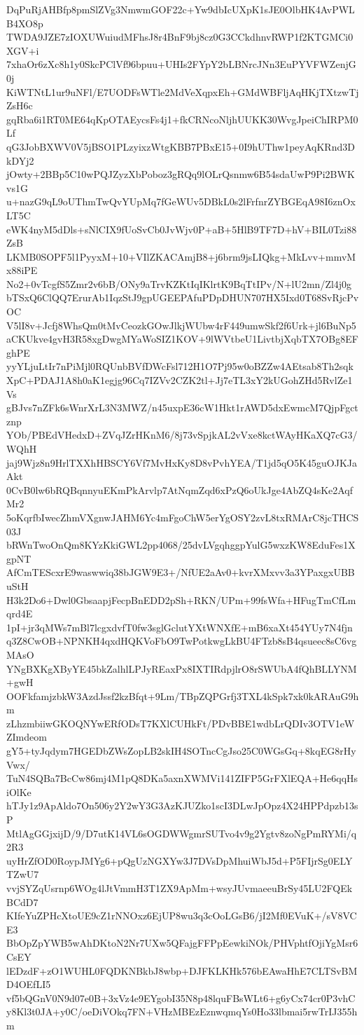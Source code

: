 DqPuRjAHBfp8pmSlZVg3NmwmGOF22c+Yw9dbIcUXpK1sJE0OlbHK4AvPWLB4XO8p
TWDA9JZE7zIOXUWuiudMFhsJ8r4BnF9bj8cz0G3CCkdhnvRWP1f2KTGMCi0XGV+i
7xhaOr6zXc8h1y0SkcPClVf96bpuu+UHIs2FYpY2bLBNrcJNn3EuPYVFWZenjG0j
KiWTNtL1ur9uNFl/E7UODFsWTle2MdVeXqpxEh+GMdWBFljAqHKjTXtzwTjZsH6c
gqRba6i1RT0ME64qKpOTAEycsFs4j1+fkCRNcoNljhUUKK30WvgJpeiChIRPM0Lf
qG3JobBXWV0V5jBSO1PLzyixzWtgKBB7PBxE15+0I9hUThw1peyAqKRnd3DkDYj2
jOwty+2BBp5C10wPQJZyzXbPoboz3gRQq9lOLrQsnmw6B54sdaUwP9Pi2BWKvs1G
u+nazG9qL9oUThmTwQvYUpMq7fGeWUv5DBkL0s2lFrfnrZYBGEqA98I6znOxLT5C
eWK4nyM5dDls+sNlCIX9fUoSvCb0JvWjv0P+aB+5HlB9TF7D+hV+BIL0Tzi88ZsB
LKMB0SOPF5l1PyyxM+10+VIlZKACAmjB8+j6brm9jsLIQkg+MkLvv+mmvMx88iPE
No2+0vTcgfS5Zmr2v6bB/ONy9aTrvKZKtIqIKlrtK9BqTtIPv/N+lU2mn/Zl4j0g
bTSxQ6ClQQ7ErurAb1IqzStJ9gpUGEEPAfuPDpDHUN707HX5Ixd0T68SvRjcPvOC
V5lI8v+Jcfj8WhsQm0tMvCeozkGOwJlkjWUbw4rF449umwSkf2f6Urk+jl6BuNp5
aCKUkve4gvH3R58xgDwgMYaWoSIZ1KOV+9lWVtbeU1LivtbjXqbTX7OBg8EFghPE
yyYLjuLtIr7nPiMjl0RQUnbBVfDWcFsl712H1O7Pj95w0oBZZw4AEtsab8Th2sqk
XpC+PDAJ1A8h0aK1egjg96Cq7IZVv2CZK2tl+Jj7eTL3xY2kUGohZHd5RvlZe1Vs
gBJvs7nZFk6sWnrXrL3N3MWZ/n45uxpE36cW1Hkt1rAWD5dxEwmcM7QjpFgctznp
YOb/PBEdVHedxD+ZVqJZrHKnM6/8j73vSpjkAL2vVxe8kctWAyHKaXQ7cG3/WQhH
jaj9Wjz8n9HrlTXXhHBSCY6Vf7MvHxKy8D8vPvhYEA/T1jd5qO5K45guOJKJaAkt
0CvB0lw6bRQBqnnyuEKmPkArvlp7AtNqmZqd6xPzQ6oUkJge4AbZQ4sKe2AqfMr2
5oKqrfbIwecZhmVXgnwJAHM6Yc4mFgoChW5erYgOSY2zvL8txRMArC8jcTHCS03J
bRWnTwoOnQm8KYzKkiGWL2pp4068/25dvLVgqhggpYulG5wxzKW8EduFes1XgpNT
AfCmTEScxrE9waswwiq38bJGW9E3+/NfUE2aAv0+kvrXMxvv3a3YPaxgxUBBuStH
H3k2Do6+Dwl0GbsaapjFecpBnEDD2pSh+RKN/UPm+99fsWfa+HFugTmCfLmqrd4E
1pI+jr3qMWs7mBl7lcgxdvfT0fw3sglGclutYXtWNXfE+mB6xaXt454YUy7N4fjn
q3Z8CwOB+NPNKH4qxdHQKVoFbO9TwPotkwgLkBU4FTzb8sB4qsueec8sC6vgMAsO
YNgBXKgXByYE45bkZalhlLPJyREaxPx8IXTIRdpjlrO8rSWUbA4fQhBLLYNM+gwH
OOFkfamjzbkW3AzdJssf2kzBfqt+9Lm/TBpZQPGrfj3TXL4kSpk7xk0kARAuG9hm
zLhzmbiiwGKOQNYwERfODsT7KXlCUHkFt/PDvBBE1wdbLrQDIv3OTV1eWZImdeom
gY5+tyJqdym7HGEDbZWsZopLB2skIH4SOTncCgJso25C0WGsGq+8kqEG8rHyVwx/
TuN4SQBa7BcCw86mj4M1pQ8DKa5axnXWMVi141ZIFP5GrFXlEQA+He6qqHsiOlKe
hTJy1z9ApAldo7On506y2Y2wY3G3AzKJUZko1scI3DLwJpOpz4X24HPPdpzb13sP
MtlAgGGjxijD/9/D7utK14VL6sOGDWWgmrSUTvo4v9g2Ygtv8zoNgPmRYMi/q2R3
uyHrZfOD0RoypJMYg6+pQgUzNGXYw3J7DVsDpMhuiWbJ5d+P5FIjrSg0ELYTZwU7
vvjSYZqUsrnp6WOg4lJtVmmH3T1ZX9ApMm+wsyJUvmaeeuBrSy45LU2FQEkBCdD7
KIfeYuZPHcXtoUE9cZ1rNNOxz6EjUP8wu3q3cOoLGsB6/jI2Mf0EVuK+/sV8VCE3
BbOpZpYWB5wAhDKtoN2Nr7UXw5QFajgFFPpEewkiNOk/PHVphtfOjiYgMsr6CsEY
lEDzdF+zO1WUHL0FQDKNBkbJ8wbp+DJFKLKHk576bEAwaHhE7CLTSvBMD4OEfLI5
vf5bQGnV0N9d07e0B+3xVz4e9EYgobI35N8p48lquFBsWLt6+g6yCx74cr0P3vhC
y8Kl3t0JA+y0C/oeDiVOkq7FN+VHzMBEzEznwqmqYs0Ho33lbmai5rwTrIJ355hm
